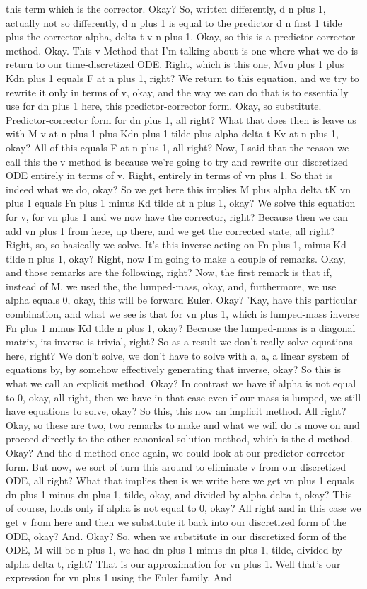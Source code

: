 \documentclass[10pt]{article}
\begin{document}
this term which is the corrector. Okay? So, written differently, d n plus 1, actually not so differently, d n plus 1 is equal to the predictor d n first 1 tilde plus the corrector alpha, delta t v n plus 1. Okay, so this is a predictor-corrector method. Okay. This v-Method that I'm talking about is one where what we do is return to our time-discretized ODE. Right, which is this one, Mvn plus 1 plus Kdn plus 1 equals F at n plus 1, right? We return to this equation, and we try to rewrite it only in terms of v, okay, and the way we can do that is to essentially use for dn plus 1 here, this predictor-corrector form. Okay, so substitute. Predictor-corrector form for dn plus 1, all right? What that does then is leave us with M v at n plus 1 plus Kdn plus 1 tilde plus alpha delta t Kv at n plus 1, okay? All of this equals F at n plus 1, all right? Now, I said that the reason we call this the v method is because we're going to try and rewrite our discretized ODE entirely in terms of v. Right, entirely in terms of vn plus 1. So that is indeed what we do, okay? So we get here this implies M plus alpha delta tK vn plus 1 equals Fn plus 1 minus Kd tilde at n plus 1, okay? We solve this equation for v, for vn plus 1 and we now have the corrector, right? Because then we can add vn plus 1 from here, up there, and we get the corrected state, all right? Right, so, so basically we solve. It's this inverse acting on Fn plus 1, minus Kd tilde n plus 1, okay? Right, now I'm going to make a couple of remarks. Okay, and those remarks are the following, right? Now, the first remark is that if, instead of M, we used the, the lumped-mass, okay, and, furthermore, we use alpha equals 0, okay, this will be forward Euler. Okay? 'Kay, have this particular combination, and what we see is that for vn plus 1, which is lumped-mass inverse Fn plus 1 minus Kd tilde n plus 1, okay? Because the lumped-mass is a diagonal matrix, its inverse is trivial, right? So as a result we don't really solve equations here, right? We don't solve, we don't have to solve with a, a, a linear system of equations by, by somehow effectively generating that inverse, okay? So this is what we call an explicit method. Okay? In contrast we have if alpha is not equal to 0, okay, all right, then we have in that case even if our mass is lumped, we still have equations to solve, okay? So this, this now an implicit method. All right? Okay, so these are two, two remarks to make and what we will do is move on and proceed directly to the other canonical solution method, which is the d-method. Okay? And the d-method once again, we could look at our predictor-corrector form. But now, we sort of turn this around to eliminate v from our discretized ODE, all right? What that implies then is we write here we get vn plus 1 equals dn plus 1 minus dn plus 1, tilde, okay, and divided by alpha delta t, okay? This of course, holds only if alpha is not equal to 0, okay? All right and in this case we get v from here and then we substitute it back into our discretized form of the ODE, okay? And. Okay? So, when we substitute in our discretized form of the ODE, M will be n plus 1, we had dn plus 1 minus dn plus 1, tilde, divided by alpha delta t, right? That is our approximation for vn plus 1. Well that's our expression for vn plus 1 using the Euler family. And 
\end{document}
